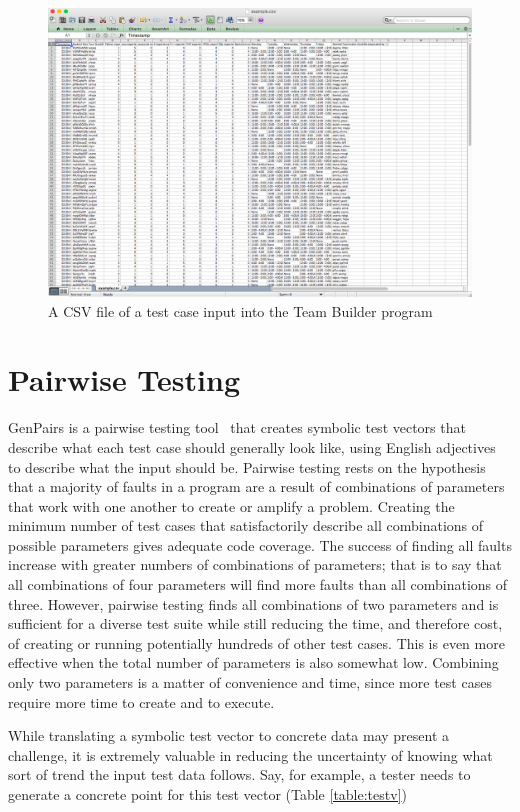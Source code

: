 \begin{figure}[!h]
\includegraphics[scale=0.35]{team-file.png}
\caption{A CSV file of a test case input into the Team Builder program}
\label{fig:teamfile}
\end{figure}

\section{Pairwise Testing}
GenPairs is a pairwise testing tool~\cite{Gen:Pairs} that creates symbolic test vectors that describe what each test case should generally look like, using English adjectives to describe what the input should be. Pairwise testing rests on the hypothesis that a majority of faults in a program are a result of combinations of parameters that work with one another to create or amplify a problem. Creating the minimum number of test cases that satisfactorily describe all combinations of possible parameters gives adequate code coverage. The success of finding all faults increase with greater numbers of combinations of parameters; that is to say that all combinations of four parameters will find more faults than all combinations of three. However, pairwise testing finds all combinations of two parameters and is sufficient for a diverse test suite while still reducing the time, and therefore cost, of creating or running potentially hundreds of other test cases. This is even more effective when the total number of parameters is also somewhat low. Combining only two parameters is a matter of convenience and time, since more test cases require more time to create and to execute.

While translating a symbolic test vector to concrete data may present a challenge, it is extremely valuable in reducing the uncertainty of knowing what sort of trend the input test data follows. Say, for example, a tester needs to generate a concrete point for this test vector (Table \ref{table:testv})

